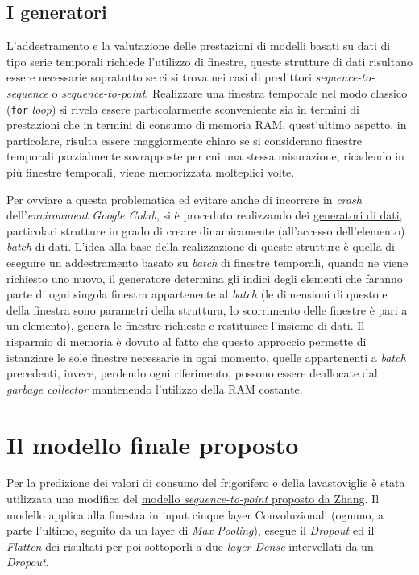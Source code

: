 \documentclass[12pt,a4paper,fleqn]{article}
\begin{document}
\subsection{I generatori}
L'addestramento e la valutazione delle prestazioni di modelli basati su dati di tipo serie temporali richiede l'utilizzo di finestre, queste strutture di dati risultano essere necessarie sopratutto se ci si trova nei casi di predittori \textsl{sequence-to-sequence} o \textsl{sequence-to-point}. Realizzare una finestra temporale nel modo classico (\texttt{for} \textit{loop}) si rivela essere particolarmente sconveniente sia in termini di prestazioni che in termini di consumo di memoria RAM, quest'ultimo aspetto, in particolare, risulta essere maggiormente chiaro se si considerano finestre temporali parzialmente sovrapposte per cui una stessa misurazione, ricadendo in più finestre temporali, viene memorizzata molteplici volte.

Per ovviare a questa problematica ed evitare anche di incorrere in \textsl{crash} dell'\textsl{environment Google Colab}, si è proceduto realizzando dei \href{https://stanford.edu/~shervine/blog/keras-how-to-generate-data-on-the-fly}{generatori di dati}, particolari strutture in grado di creare dinamicamente (all'accesso dell'elemento) \textsl{batch} di dati. L'idea alla base della realizzazione di queste strutture è quella di eseguire un addestramento basato su \textsl{batch} di finestre temporali, quando ne viene richiesto uno nuovo, il generatore determina gli indici degli elementi che faranno parte di ogni singola finestra appartenente al \textsl{batch} (le dimensioni di questo e della finestra sono parametri della struttura, lo scorrimento delle finestre è pari a un elemento), genera le finestre richieste e restituisce l'insieme di dati. Il risparmio di memoria è dovuto al fatto che questo approccio permette di istanziare le sole finestre necessarie in ogni momento, quelle appartenenti a \textsl{batch} precedenti, invece, perdendo ogni riferimento, possono essere deallocate dal \textsl{garbage collector} mantenendo l'utilizzo della RAM costante.

\section{Il modello finale proposto}

Per la predizione dei valori di consumo del frigorifero e della lavastoviglie è stata utilizzata una modifica del \href{https://arxiv.org/abs/1612.09106}{modello \textsl{sequence-to-point} proposto da Zhang}.
Il modello applica alla finestra in input cinque layer Convoluzionali (ognuno, a parte l'ultimo, seguito da un layer di \textsl{Max Pooling}), esegue il \textsl{Dropout} ed il \textsl{Flatten} dei risultati per poi sottoporli a due \textsl{layer Dense} intervellati da un \textsl{Dropout}.
\end{document}
